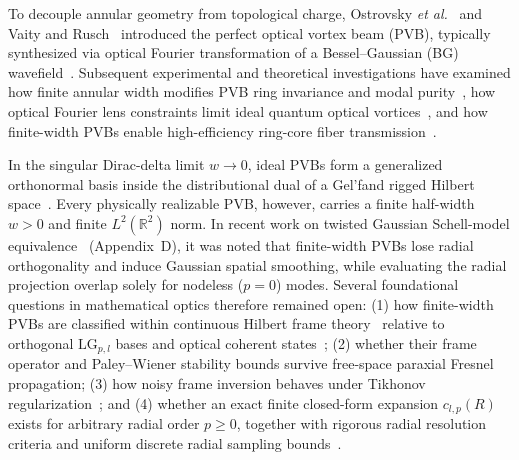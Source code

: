 \documentclass{optica-article}
\begin{document}
To decouple annular geometry from topological charge, Ostrovsky \emph{et al.}~\cite{Ostrovsky2013} and Vaity and Rusch~\cite{Vaity2015} introduced the perfect optical vortex beam (PVB), typically synthesized via optical Fourier transformation of a Bessel--Gaussian (BG) wavefield~\cite{Gori1987,Reddy2016,Jabir2016Variable}. Subsequent experimental and theoretical investigations have examined how finite annular width modifies PVB ring invariance and modal purity~\cite{Pinnell2019HowPerfect,Pinnell2019Quantitative,Yan2022Customizable}, how optical Fourier lens constraints limit ideal quantum optical vortices~\cite{Banerji2016,Barral2017}, and how finite-width PVBs enable high-efficiency ring-core fiber transmission~\cite{Villalba2023}.

In the singular Dirac-delta limit $w \to 0$, ideal PVBs form a generalized orthonormal basis inside the distributional dual of a Gel'fand rigged Hilbert space~\cite{Gelfand1964,Ferreira2026}. Every physically realizable PVB, however, carries a finite half-width $w > 0$ and finite $L^2(\mathbb{R}^2)$ norm. In recent work on twisted Gaussian Schell-model equivalence~\cite{Ferreira2026} (Appendix~D), it was noted that finite-width PVBs lose radial orthogonality and induce Gaussian spatial smoothing, while evaluating the radial projection overlap solely for nodeless ($p = 0$) modes. Several foundational questions in mathematical optics therefore remained open: (1) how finite-width PVBs are classified within continuous Hilbert frame theory~\cite{Duffin1952,Daubechies1990,Ali1993,Christensen2016,Bastiaans1980,Grochenig2016} relative to orthogonal $\mathrm{LG}_{p,l}$ bases and optical coherent states~\cite{Klauder1985,Perelomov1986,Gazeau2009,Gazeau2018,MoralesRodriguez2024OL,MoralesRodriguez2024PRA}; (2) whether their frame operator and Paley--Wiener stability bounds survive free-space paraxial Fresnel propagation; (3) how noisy frame inversion behaves under Tikhonov regularization~\cite{Engl1996}; and (4) whether an exact finite closed-form expansion $c_{l,p}(R)$ exists for arbitrary radial order $p \ge 0$, together with rigorous radial resolution criteria and uniform discrete radial sampling bounds~\cite{Bownik2026}.
\end{document}
